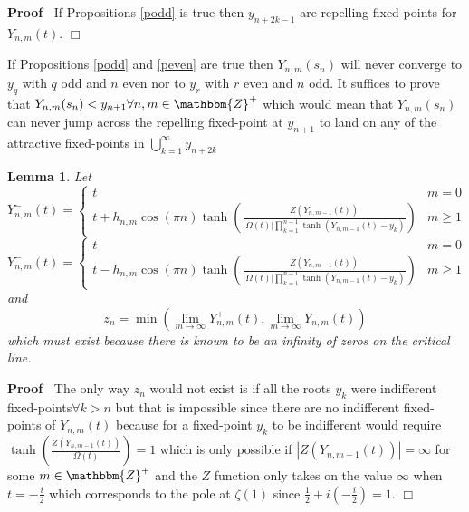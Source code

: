 \documentclass{article}
\newenvironment{proof}{\noindent\textbf{Proof\ }}{\hspace*{\fill}$\Box$\medskip}
\newtheorem{lemma}{Lemma}
{\theorembodyfont{\rmfamily}\newtheorem{note}{Note}}
\begin{document}
\begin{proof}
  If Propositions \ref{podd} is true then $y_{n + 2 k - 1}$ are repelling
  fixed-points for $Y_{n, m} (t)$.
\end{proof}

\begin{note}
  If Propositions \ref{podd} and \ref{peven} are true then $Y_{n, m} (s_n)$
  will never converge to $y_q$ with $q$ odd and $n$ even nor to $y_r$ with $r$
  even and $n$ odd. It suffices to prove that $Y_{n, m} (s_n) < y_{n + 1}
  \forall n, m \in \mathbbm{Z}^+$ which would mean that $Y_{n, m} (s_n)$ can
  never jump across the repelling fixed-point at $y_{n + 1}$ to land on any of
  the attractive fixed-points in $\bigcup_{k = 1}^{\infty} y_{n + 2 k}$
\end{note}

\begin{lemma}
  Let
  \begin{equation}
    Y^-_{n, m} (t) = \left\{ \begin{array}{ll}
      t & m = 0\\
      t + h_{n, m} \cos (\pi n) \tanh \left( \frac{Z (Y_{n, m - 1} (t))}{|
      \Omega (t) | \prod_{k = 1}^{n - 1} \tanh (Y_{n, m - 1} (t) - y_k)}
      \right) & m \geqslant 1
    \end{array} \right.
  \end{equation}
  \begin{equation}
    Y^-_{n, m} (t) = \left\{ \begin{array}{ll}
      t & m = 0\\
      t - h_{n, m} \cos (\pi n) \tanh \left( \frac{Z (Y_{n, m - 1} (t))}{|
      \Omega (t) | \prod_{k = 1}^{n - 1} \tanh (Y_{n, m - 1} (t) - y_k)}
      \right) & m \geqslant 1
    \end{array} \right.
  \end{equation}
  and
  \begin{equation}
    z_n = \min (\lim_{m \rightarrow \infty} Y^+_{n, m} (t), \lim_{m
    \rightarrow \infty} Y^-_{n, m} (t))
  \end{equation}
  which must exist because there is known to be an infinity of zeros on the
  critical line. 
\end{lemma}

\begin{proof}
  The only way $z_n$ would not exist is if all the roots $y_k$ were
  indifferent fixed-points$\forall k > n$ but that is impossible since there
  are no indifferent fixed-points of $Y_{n, m} (t)$ because for a fixed-point
  $y_k$ to be indifferent would require $\tanh \left( \frac{Z (Y_{n, m - 1}
  (t))}{| \Omega (t) |} \right) = 1$ which is only possible if $| Z (Y_{n, m -
  1} (t)) | = \infty$ for some $m \in \mathbbm{Z}^+$ and the $Z$ function only
  takes on the value $\infty$ when $t = - \frac{i}{2}$ which corresponds to
  the pole at $\zeta (1)$ since $\frac{1}{2} + i \left( - \frac{i}{2} \right)
  = 1$.
\end{proof}
\end{document}
